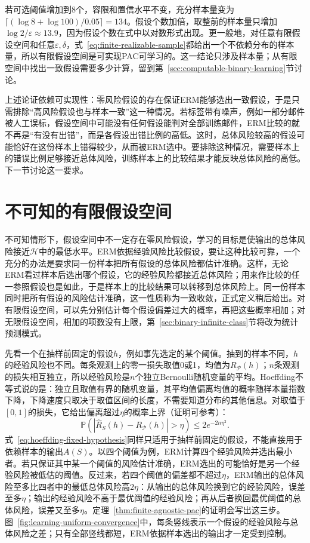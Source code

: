 若可选阈值增加到8个，容限和置信水平不变，充分样本量变为$\lceil(\log8+\log100)/0.05\rceil=134$。假设个数加倍，取整前的样本量只增加$\log2/\varepsilon\approx13.9$，因为假设个数在式中以对数形式出现。更一般地，对任意有限假设空间和任意$\varepsilon,\delta$，式~\eqref{eq:finite-realizable-sample}都给出一个不依赖分布的样本量，所以有限假设空间是可实现PAC可学习的。这一结论只涉及样本量；从有限空间中找出一致假设需要多少计算，留到第~\ref{sec:computable-binary-learning}节讨论。

上述论证依赖可实现性：零风险假设的存在保证ERM能够选出一致假设，于是只需排除“高风险假设也与样本一致”这一种情况。若标签带有噪声，例如一部分邮件被人工误标，假设空间中可能没有任何假设能判对全部训练邮件，ERM比较的就不再是“有没有出错”，而是各假设出错比例的高低。这时，总体风险较高的假设可能恰好在这份样本上错得较少，从而被ERM选中。要排除这种情况，需要样本上的错误比例足够接近总体风险，训练样本上的比较结果才能反映总体风险的高低。下一节讨论这一要求。

\section{不可知的有限假设空间}
\label{sec:binary-uniform-convergence}

不可知情形下，假设空间中不一定存在零风险假设，学习的目标是使输出的总体风险接近$\mathcal H$中的最低水平。ERM依据经验风险比较假设，要让这种比较可靠，一个充分的办法是要求同一份样本把所有假设的总体风险都估计准确。这样，无论ERM看过样本后选出哪个假设，它的经验风险都接近总体风险；用来作比较的任一参照假设也是如此，于是样本上的比较结果可以转移到总体风险上。同一份样本同时把所有假设的风险估计准确，这一性质称为一致收敛，正式定义稍后给出。对有限假设空间，可以先分别估计每个假设偏差过大的概率，再把这些概率相加；对无限假设空间，相加的项数没有上限，第~\ref{sec:binary-infinite-class}节将改为统计预测模式。

先看一个在抽样前固定的假设$h$，例如事先选定的某个阈值。抽到的样本不同，$h$的经验风险也不同。每条观测上的零一损失取值0或1，均值为$R_{\mathcal P}(h)$；$n$条观测的损失相互独立，所以经验风险是$n$个独立Bernoulli随机变量的平均。Hoeffding不等式说的是：独立且取值有界的随机变量，其平均值偏离均值的概率随样本量指数下降，下降速度只取决于取值区间的长度，不需要知道分布的其他信息。对取值于$[0,1]$的损失，它给出偏离超过$\eta$的概率上界（证明可参考）：
\begin{equation}
 \mathbb P\left(\left|\hat R_S(h)-R_{\mathcal P}(h)\right|>\eta\right)
 \leq2e^{-2n\eta^2}.
 \label{eq:hoeffding-fixed-hypothesis}
\end{equation}
式~\eqref{eq:hoeffding-fixed-hypothesis}同样只适用于抽样前固定的假设，不能直接用于依赖样本的输出$A(S)$。以四个阈值为例，ERM计算四个经验风险并选出最小者。若只保证其中某一个阈值的风险估计准确，ERM选出的可能恰好是另一个经验风险被低估的阈值。反过来，若四个阈值的偏差都不超过$\eta$，ERM输出的总体风险至多比四者中的最低总体风险高$2\eta$：从输出的总体风险换到它的经验风险，误差至多$\eta$；输出的经验风险不高于最优阈值的经验风险；再从后者换回最优阈值的总体风险，误差又至多$\eta$。定理~\ref{thm:finite-agnostic-pac}的证明会写出这三步。图~\ref{fig:learning-uniform-convergence}中，每条竖线表示一个假设的经验风险与总体风险之差；只有全部竖线都短，ERM依据样本选出的输出才一定受到控制。

